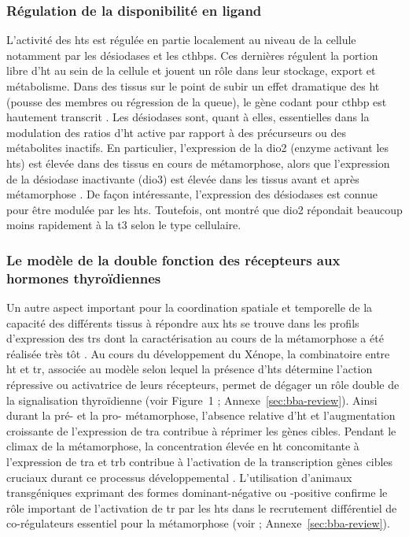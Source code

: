 \documentclass[../main.tex]{subfiles}
\begin{document}
\subsubsection{Régulation de la disponibilité en ligand}
L'activité des \glspl{ht} est régulée en partie localement au niveau de la cellule notamment par les désiodases et les \glspl{cthbp}.
Ces dernières régulent la portion libre d'\gls{ht} au sein de la cellule et jouent un rôle dans leur stockage, export et métabolisme.
Dans des tissus sur le point de subir un effet dramatique des \gls{ht} (pousse des membres ou régression de la queue), le gène codant pour \gls{cthbp} est hautement transcrit \citep{Shi1994}.
Les désiodases sont, quant à elles, essentielles dans la modulation des ratios d'\gls{ht} active par rapport à des précurseurs ou des métabolites inactifs.
En particulier, l'expression de la \gls{dio2} (enzyme activant les \glspl{ht}) est élevée dans des tissus en cours de métamorphose, alors que l'expression de la désiodase inactivante (\gls{dio3}) est élevée dans les tissus avant et après métamorphose \citep{Leloup1981,Galton1989}.
De façon intéressante, l'expression des désiodases est connue pour être modulée par les \glspl{ht}. Toutefois, \citet{Bonett2010} ont montré que \gls{dio2} répondait beaucoup moins rapidement à la \gls{t3} selon le type cellulaire.

\subsubsection{Le modèle de la double fonction des récepteurs aux hormones thyroïdiennes}
Un autre aspect important pour la coordination spatiale et temporelle de la capacité des différents tissus à répondre aux \glspl{ht} se trouve dans les profils d'expression des \glspl{tr} dont la caractérisation au cours de la métamorphose a été réalisée très tôt \citep{Yaoita1990}.
Au cours du développement du Xénope, la combinatoire entre \gls{ht} et \gls{tr}, associée au modèle selon lequel la présence d'\glspl{ht} détermine l'action répressive ou activatrice de leurs récepteurs, permet de dégager un rôle double de la signalisation thyroïdienne (voir Figure~1 \citealp{Grimaldi2012}; Annexe~\ref{sec:bba-review}).
Ainsi durant la pré- et la pro- métamorphose, l'absence relative d'\gls{ht} et l'augmentation croissante de l'expression de \gls{tra} contribue à réprimer les gènes cibles.
Pendant le climax de la métamorphose, la concentration élevée en \gls{ht} concomitante à l'expression de \gls{tra} et \gls{trb} contribue à l'activation de la transcription gènes cibles cruciaux durant ce processus développemental \citep{Sachs2000}.
L'utilisation d'animaux transgéniques exprimant des formes dominant-négative \citep{Schreiber2001,Buchholz2003} ou -positive \citep{Buchholz2004} confirme le rôle important de l'activation de \gls{tr} par les \glspl{ht} dans le recrutement différentiel de co-régulateurs essentiel pour la métamorphose (voir \citealp{Grimaldi2012}; Annexe~\ref{sec:bba-review}).
\end{document}
